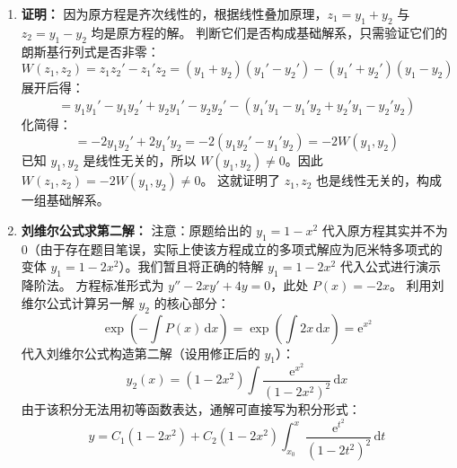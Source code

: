 \documentclass[lang=cn,11pt]{elegantbook}
\begin{document}
\begin{solution}
\begin{enumerate}
  \textbf{判断基础解系：}
  计算它们的朗斯基行列式：
  \[
  W(x) = y_1 y_2' - y_1' y_2 = \mathrm{e}^{2x}(\mathrm{e}^{2x} + 2x\mathrm{e}^{2x}) - (2\mathrm{e}^{2x})(x\mathrm{e}^{2x}) = \mathrm{e}^{4x} \neq 0
  \]
  由于 $W(x) \neq 0$，两者线性无关，因此它们构成基础解系。
  \item[(2)] \textbf{证明：}
  因为原方程是齐次线性的，根据线性叠加原理，$z_1 = y_1 + y_2$ 与 $z_2 = y_1 - y_2$ 均是原方程的解。
  判断它们是否构成基础解系，只需验证它们的朗斯基行列式是否非零：
  \[
  W(z_1, z_2) = z_1 z_2' - z_1' z_2 = (y_1+y_2)(y_1'-y_2') - (y_1'+y_2')(y_1-y_2)
  \]
  展开后得：
  \[
  = y_1 y_1' - y_1 y_2' + y_2 y_1' - y_2 y_2' - (y_1' y_1 - y_1' y_2 + y_2' y_1 - y_2' y_2)
  \]
  化简得：
  \[
  = -2 y_1 y_2' + 2 y_1' y_2 = -2 (y_1 y_2' - y_1' y_2) = -2 W(y_1, y_2)
  \]
  已知 $y_1, y_2$ 是线性无关的，所以 $W(y_1, y_2) \neq 0$。因此 $W(z_1, z_2) = -2 W(y_1, y_2) \neq 0$。
  这就证明了 $z_1, z_2$ 也是线性无关的，构成一组基础解系。
  \item[(3)] \textbf{刘维尔公式求第二解：}
  注意：原题给出的 $y_1=1-x^2$ 代入原方程其实并不为 $0$（由于存在题目笔误，实际上使该方程成立的多项式解应为厄米特多项式的变体 $y_1 = 1-2x^2$）。我们暂且将正确的特解 $y_1 = 1-2x^2$ 代入公式进行演示降阶法。
  方程标准形式为 $y'' - 2x y' + 4y = 0$，此处 $P(x) = -2x$。
  利用刘维尔公式计算另一解 $y_2$ 的核心部分：
  \[
  \exp\left(-\int P(x)\,\mathrm{d}x\right) = \exp\left(\int 2x\,\mathrm{d}x\right) = \mathrm{e}^{x^2}
  \]
  代入刘维尔公式构造第二解（设用修正后的 $y_1$）：
  \[
  y_2(x) = (1-2x^2) \int \frac{\mathrm{e}^{x^2}}{(1-2x^2)^2} \,\mathrm{d}x
  \]
  由于该积分无法用初等函数表达，通解可直接写为积分形式：
  \[
  y = C_1(1-2x^2) + C_2(1-2x^2) \int_{x_0}^x \frac{\mathrm{e}^{t^2}}{(1-2t^2)^2} \,\mathrm{d}t
  \]
\end{enumerate}
\end{solution}
\end{document}
